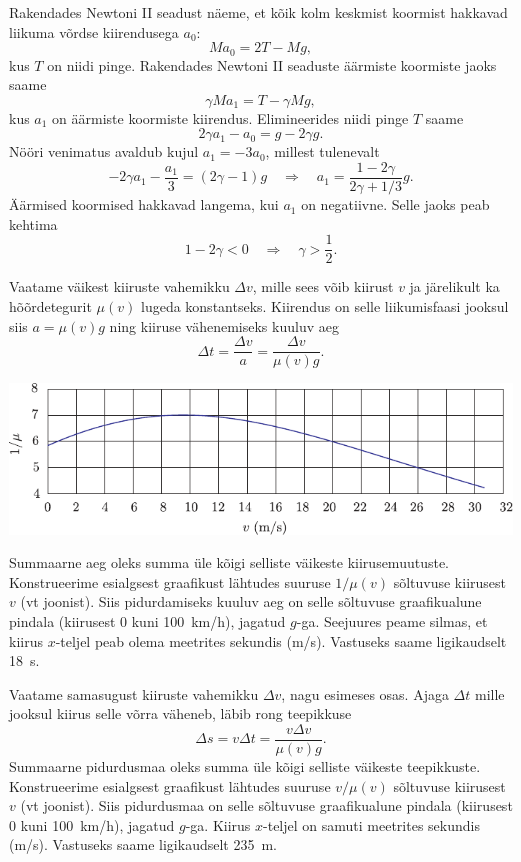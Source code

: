 \documentclass[10pt]{article}
\begin{document}
{%

\solu
Rakendades Newtoni II seadust näeme, et kõik kolm keskmist koormist hakkavad liikuma võrdse kiirendusega $a_0$: 
\[
M a_0 = 2T - Mg,
\]
kus $T$ on niidi pinge. Rakendades Newtoni II seaduste äärmiste koormiste jaoks saame
\[
\gamma M a_1 = T - \gamma Mg,
\]
kus $a_1$ on äärmiste koormiste kiirendus. Elimineerides niidi pinge $T$ saame
\[
2\gamma a_1 - a_0 = g - 2\gamma g.
\] 
Nööri venimatus avaldub kujul $a_1 = -3a_0$, millest tulenevalt 
\[
-2 \gamma a_{1}-\frac{a_{1}}{3}=(2 \gamma-1) g \quad \Rightarrow \quad a_{1}=\frac{1-2 \gamma}{2 \gamma+1 / 3} g.
\]
Äärmised koormised hakkavad langema, kui $a_1$ on negatiivne. Selle jaoks peab kehtima
\[
1-2 \gamma<0 \quad\Rightarrow\quad \gamma>\frac{1}{2}.
\]
\probend
\bigskip


\solu
\osa Vaatame väikest kiiruste vahemikku $\Delta v$, mille sees võib kiirust $v$ ja järelikult ka hõõrdetegurit $\mu (v)$ lugeda konstantseks. Kiirendus on selle liikumisfaasi jooksul siis $a = \mu (v)g$ ning kiiruse vähenemiseks kuuluv aeg
\[
\Delta t=\frac{\Delta v}{a}=\frac{\Delta v}{\mu(v) g}.
\]

\begin{center}
	\includegraphics[width=\linewidth]{2006-lahg-10-lah1}
\end{center}

Summaarne aeg oleks summa üle kõigi selliste väikeste kiirusemuutuste. Konstrueerime esialgsest graafikust lähtudes suuruse $1/\mu (v)$ sõltuvuse kiirusest $v$ (vt joonist). Siis pidurdamiseks kuuluv aeg on selle sõltuvuse graafikualune pindala (kiirusest \num{0} kuni \SI{100}{km/h}), jagatud $g$-ga. Seejuures peame silmas, et kiirus $x$-teljel peab olema meetrites sekundis (\si{m/s}). Vastuseks saame ligikaudselt \SI{18}{s}.

\osa Vaatame samasugust kiiruste vahemikku $\Delta v$, nagu esimeses osas. Ajaga $\Delta t$ mille jooksul kiirus selle võrra väheneb, läbib rong teepikkuse
\[
\Delta s = v\Delta t = \frac{v\Delta v}{\mu (v)g}.
\]
Summaarne pidurdusmaa oleks summa üle kõigi selliste väikeste teepikkuste. Konstrueerime esialgsest graafikust lähtudes suuruse $v/\mu (v)$ sõltuvuse kiirusest $v$ (vt joonist). Siis pidurdusmaa on selle sõltuvuse graafikualune pindala (kiirusest \num{0} kuni \SI{100}{km/h}), jagatud $g$-ga. Kiirus $x$-teljel on samuti meetrites sekundis (\si{m/s}). Vastuseks saame ligikaudselt \SI{235}{m}.

}
\end{document}
